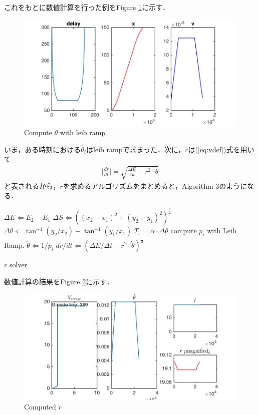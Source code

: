 \documentclass[twocolumn,oneside,a4paper]{article}
\begin{document}
これをもとに数値計算を行った例をFigure \ref{fig:leib_ramp_result}に示す．

\begin{figure}[htbp]
    \includegraphics[bb=0 0 432 216,width=1\columnwidth]{leib_ramp_screenshot.png}
    \caption{Compute $\dot{\theta}$ with leib ramp}
    \label{fig:leib_ramp_result}
\end{figure}

いま，ある時刻における$\dot{\theta_i}$はleib rampで求まった．次に，$\dot r$は(\ref{eq:vdef})式を用いて
\begin{eqnarray}
	\bigg|\frac{dr}{dt}\bigg| = \sqrt{\frac{\Delta E}{\Delta t} - r^2 \cdot \dot \theta}
\end{eqnarray}
と表されるから，$\dot r$を求めるアルゴリズムをまとめると，Algorithm 3のようになる．

\begin{algorithm}[htbp]                  
\begin{algorithmic}                  
\label{alg:drdt}                          
\STATE $\Delta E \Leftarrow E_2-E_1$
\STATE $\Delta S \Leftarrow ((x_2-x_1)^2 + (y_2-y_1)^2)^{\frac{1}{2}}$
\STATE $\Delta \theta \Leftarrow \tan^{-1} (y_2/x_2) - \tan^{-1} (y_1/x_1)$
\STATE $T_s = \alpha \cdot \Delta \theta$
\STATE compute $p_i$ with Leib Ramp.
\STATE $\dot \theta \Leftarrow 1 / p_i $ 
\STATE $dr/dt \Leftarrow (\Delta E/\Delta t-r^2 \cdot \dot \theta)^{\frac{1}{2}}$
\end{algorithmic}
\caption{$\dot r$ solver}

\end{algorithm}

数値計算の結果をFigure \ref{eq:rdot_simulation}に示す．

\begin{figure}[htbp]
    \includegraphics[bb=0 0 432 216,width=1\columnwidth]{compute_rdot_screenshot.png}
    \caption{Computed $\dot r$}
   \label{eq:rdot_simulation}
\end{figure}
\end{document}
